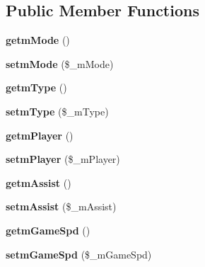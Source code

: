 \subsection*{Public Member Functions}
\begin{DoxyCompactItemize}
\item 
{\bfseries getm\+Mode} ()\hypertarget{class_reversi_setting_a4ed7f3bdbf5c81ccb1d7a110b784d729}{}\label{class_reversi_setting_a4ed7f3bdbf5c81ccb1d7a110b784d729}

\item 
{\bfseries setm\+Mode} (\$\+\_\+m\+Mode)\hypertarget{class_reversi_setting_a39167d7120c0f7be3d71fb8b36d4b2d2}{}\label{class_reversi_setting_a39167d7120c0f7be3d71fb8b36d4b2d2}

\item 
{\bfseries getm\+Type} ()\hypertarget{class_reversi_setting_a4a6f8c370ba7f56090a4589dd764985c}{}\label{class_reversi_setting_a4a6f8c370ba7f56090a4589dd764985c}

\item 
{\bfseries setm\+Type} (\$\+\_\+m\+Type)\hypertarget{class_reversi_setting_ad32dae55a2718993d5b0cf9e85a9a201}{}\label{class_reversi_setting_ad32dae55a2718993d5b0cf9e85a9a201}

\item 
{\bfseries getm\+Player} ()\hypertarget{class_reversi_setting_a5070a9ab795fa2f316723066dd9ee7ca}{}\label{class_reversi_setting_a5070a9ab795fa2f316723066dd9ee7ca}

\item 
{\bfseries setm\+Player} (\$\+\_\+m\+Player)\hypertarget{class_reversi_setting_a31f291d8896090ba483ce66a62268843}{}\label{class_reversi_setting_a31f291d8896090ba483ce66a62268843}

\item 
{\bfseries getm\+Assist} ()\hypertarget{class_reversi_setting_addf31d3fffb8c3d095e7be3fc29e72e6}{}\label{class_reversi_setting_addf31d3fffb8c3d095e7be3fc29e72e6}

\item 
{\bfseries setm\+Assist} (\$\+\_\+m\+Assist)\hypertarget{class_reversi_setting_a828afe27a985d264802d155f22cc69c1}{}\label{class_reversi_setting_a828afe27a985d264802d155f22cc69c1}

\item 
{\bfseries getm\+Game\+Spd} ()\hypertarget{class_reversi_setting_aa68659744b5089035ba6e945e4d566c8}{}\label{class_reversi_setting_aa68659744b5089035ba6e945e4d566c8}

\item 
{\bfseries setm\+Game\+Spd} (\$\+\_\+m\+Game\+Spd)\hypertarget{class_reversi_setting_afdb2caa1a2e59f8c25d27c8d4eba2055}{}\label{class_reversi_setting_afdb2caa1a2e59f8c25d27c8d4eba2055}


\end{DoxyCompactItemize}
